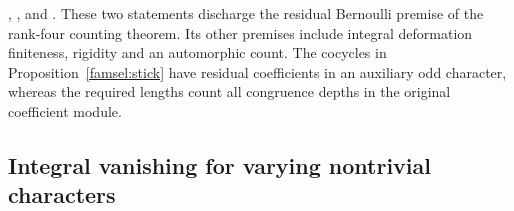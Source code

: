 ,
, and
.
These two statements discharge the residual Bernoulli premise of the
rank-four counting theorem. Its other premises include integral
deformation finiteness, rigidity and an automorphic count. The cocycles
in Proposition~\ref{famsel:stick} have residual coefficients in an
auxiliary odd character, whereas the required lengths count all
congruence depths in the original coefficient module.

\subsection{Integral vanishing for varying nontrivial characters}

